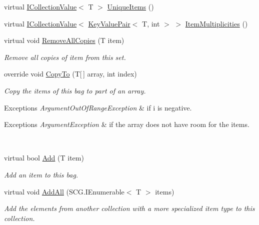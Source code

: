 \begin{DoxyCompactItemize}
virtual \hyperlink{interface_c5_1_1_i_collection_value}{I\+Collection\+Value}$<$ T $>$ \hyperlink{class_c5_1_1_hash_bag_ab6b0278effda160df10814d87e885385}{Unique\+Items} ()
\item 
virtual \hyperlink{interface_c5_1_1_i_collection_value}{I\+Collection\+Value}$<$ \hyperlink{struct_c5_1_1_key_value_pair}{Key\+Value\+Pair}$<$ T, int $>$ $>$ \hyperlink{class_c5_1_1_hash_bag_a25efbcb614ab06216f52a7f34f74f8fc}{Item\+Multiplicities} ()
\item 
virtual void \hyperlink{class_c5_1_1_hash_bag_ac7e182e2105701436c1288feaeeef627}{Remove\+All\+Copies} (T item)
\begin{DoxyCompactList}\small\item\em Remove all copies of item from this set. \end{DoxyCompactList}\item 
override void \hyperlink{class_c5_1_1_hash_bag_ad7ffdb5c882c290aa8b398d499a9d2ac}{Copy\+To} (T\mbox{[}$\,$\mbox{]} array, int index)
\begin{DoxyCompactList}\small\item\em Copy the items of this bag to part of an array. 
\begin{DoxyExceptions}{Exceptions}
{\em Argument\+Out\+Of\+Range\+Exception} & if i is negative. 
\begin{DoxyExceptions}{Exceptions}
{\em Argument\+Exception} & if the array does not have room for the items. \\
\hline
\end{DoxyExceptions}
\\
\hline
\end{DoxyExceptions}
\end{DoxyCompactList}\item 
virtual bool \hyperlink{class_c5_1_1_hash_bag_a4cc47989ae0d25e5574558f973b85a8d}{Add} (T item)
\begin{DoxyCompactList}\small\item\em Add an item to this bag. \end{DoxyCompactList}\item 
virtual void \hyperlink{class_c5_1_1_hash_bag_a87617053c1b6c067efc395b1743e8ed0}{Add\+All} (S\+C\+G.\+I\+Enumerable$<$ T $>$ items)
\begin{DoxyCompactList}\small\item\em Add the elements from another collection with a more specialized item type to this collection. \end{DoxyCompactList}\item 

\end{DoxyCompactItemize}
